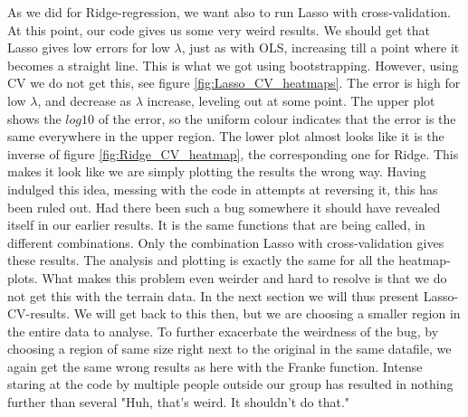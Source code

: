 \documentclass[reprint,english,notitlepage,aps,nobalancelastpage,nofootinbib]{revtex4-1}  %
\begin{document}
As we did for Ridge-regression, we want also to run Lasso with cross-validation. At this point, our code gives us some very weird results. We should get that Lasso gives low errors for low $\lambda$, just as with OLS, increasing till a point where it becomes a straight line. This is what we got using bootstrapping. However, using CV we do not get this, see figure \ref{fig:Lasso_CV_heatmaps}. The error is high for low $\lambda$, and decrease as $\lambda$ increase, leveling out at some point. The upper plot shows the $log10$ of the error, so the uniform colour indicates that the error is the same everywhere in the upper region. The lower plot almost looks like it is the inverse of figure \ref{fig:Ridge_CV_heatmap}, the corresponding one for Ridge. This makes it look like we are simply plotting the results the wrong way. Having indulged this idea, messing with the code in attempts at reversing it, this has been ruled out. Had there been such a bug somewhere it should have revealed itself in our earlier results. It is the same functions that are being called, in different combinations. Only the combination Lasso with cross-validation gives these results. The analysis and plotting is exactly the same for all the heatmap-plots. What makes this problem even weirder and hard to resolve is that we do not get this with the terrain data. In the next section we will thus present Lasso-CV-results. We will get back to this then, but we are choosing a smaller region in the entire data to analyse. To further exacerbate the weirdness of the bug, by choosing a region of same size right next to the original in the same datafile, we again get the same wrong results as here with the Franke function. Intense staring at the code by multiple people outside our group has resulted in nothing further than several "Huh, that's weird. It shouldn't do that."
\end{document}
